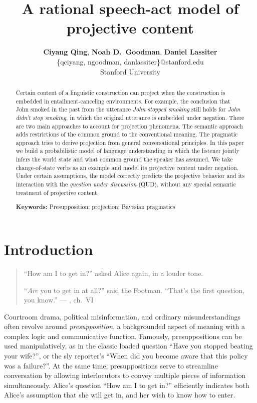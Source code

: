 \documentclass[10pt,letterpaper]{article}
\title{A rational speech-act model of projective content}
\author{{\large \bf Ciyang Qing}, {\large \bf Noah D.~Goodman}, {\large \bf Daniel Lassiter}\\
\{qciyang, ngoodman, danlassiter\}@stanford.edu\\
Stanford University}
\begin{document}
\maketitle
 
\begin{abstract}
Certain content of a linguistic construction can project when the construction is embedded in entailment-canceling environments.
 For example, the conclusion that John smoked in the past from the utterance \emph{John stopped smoking} 
 still holds for \emph{John didn't stop smoking}, in which the original utterance is 
 embedded under negation. 
 There are two main approaches to account for projection phenomena. 
 The semantic approach adds restrictions of the common ground to the conventional meaning.
 The pragmatic approach tries to derive projection from general conversational principles. 
 In this paper we build a probabilistic model of language understanding in which the listener 
  jointly infers the world state and what common ground the speaker has assumed. 
 We take change-of-state verbs as an example and model its projective content under negation. 
 Under certain assumptions, the model correctly predicts the projective behavior and its interaction with 
  the \emph{question under discussion} (QUD), without any special semantic treatment of projective content.

\textbf{Keywords:} 
Presupposition; projection; Bayesian pragmatics
\end{abstract}

\section{Introduction}
\label{sec:Intro}


\begin{quotation}

\noindent \hspace{-1ex}``How am I to get in?'' asked Alice again, in a louder tone.

\noindent \hspace{-1ex}``\emph{Are} you to get in at all?'' said the Footman. ``That's the first question, you know.'' 
\hfill
--- , ch.\ VI
\end{quotation}

Courtroom drama, political misinformation, and ordinary misunderstandings often revolve around \emph{presupposition}, a backgrounded aspect of meaning with a complex logic and communicative function. Famously, presuppositions can be used manipulatively, as in the classic loaded question ``Have you stopped beating your wife?'', or the sly reporter's ``When did you become aware that this policy was a failure?''. At the same time, presuppositions serve to streamline conversation by allowing interlocutors to convey multiple pieces of information simultaneously. Alice's question ``How am I to get in?'' efficiently indicates both Alice's assumption that she will get in, and her wish to know how to enter.
\end{document}
